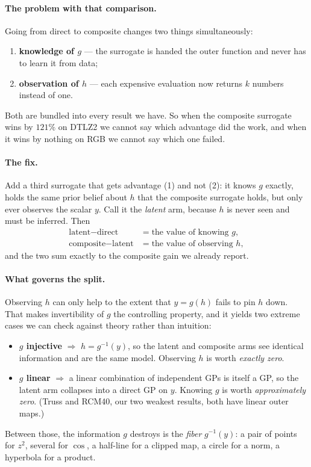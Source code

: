 \documentclass[11pt]{article}
\begin{document}
\paragraph{The problem with that comparison.} Going from direct to composite
changes two things simultaneously:
\begin{enumerate}
\item \textbf{knowledge of $g$} --- the surrogate is handed the outer function
and never has to learn it from data;
\item \textbf{observation of $h$} --- each expensive evaluation now returns $k$
numbers instead of one.
\end{enumerate}
Both are bundled into every result we have. So when the composite surrogate
wins by $121\%$ on DTLZ2 we cannot say which advantage did the work, and when it
wins by nothing on RGB we cannot say which one failed.

\paragraph{The fix.} Add a third surrogate that gets advantage (1) and not (2):
it knows $g$ exactly, holds the same prior belief about $h$ that the composite
surrogate holds, but only ever observes the scalar $y$. Call it the
\emph{latent} arm, because $h$ is never seen and must be inferred. Then
\begin{align}
\text{latent} - \text{direct} &= \text{the value of knowing } g,\\
\text{composite} - \text{latent} &= \text{the value of observing } h,
\end{align}
and the two sum exactly to the composite gain we already report.

\paragraph{What governs the split.} Observing $h$ can only help to the extent
that $y=g(h)$ fails to pin $h$ down. That makes invertibility of $g$ the
controlling property, and it yields two extreme cases we can check against
theory rather than intuition:
\begin{itemize}
\item \textbf{$g$ injective} $\Rightarrow$ $h=g^{-1}(y)$, so the latent and
composite arms see identical information and are the same model. Observing $h$
is worth \emph{exactly zero}.
\item \textbf{$g$ linear} $\Rightarrow$ a linear combination of independent GPs
is itself a GP, so the latent arm collapses into a direct GP on $y$. Knowing $g$
is worth \emph{approximately zero}. (Truss and RCM40, our two weakest results,
both have linear outer maps.)
\end{itemize}
Between those, the information $g$ destroys is the \emph{fiber} $g^{-1}(y)$: a
pair of points for $z^2$, several for $\cos$, a half-line for a clipped map, a
circle for a norm, a hyperbola for a product.
\end{document}
